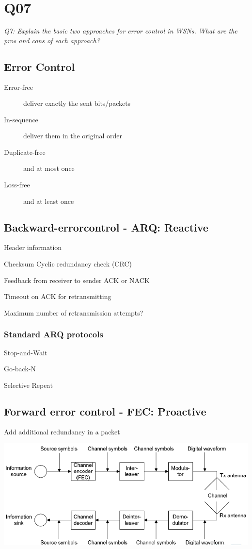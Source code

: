 \chapter{Q07}
\emph{Q7: Explain the basic two approaches for error control in WSNs. What are
the pros and cons of each approach?}

\section{Error Control}

\begin{description}
	\item[Error-free] deliver exactly the sent bits/packets
	\item[In-sequence] deliver them in the original order
	\item[Duplicate-free] and at most once
	\item[Loss-free] and at least once
\end{description}


\section{Backward-errorcontrol - ARQ: Reactive}

Header information

Checksum Cyclic redundancy check (CRC) 

Feedback from receiver to sender ACK or NACK

Timeout on ACK for retransmitting

Maximum number of retransmission attempts?

\subsection{Standard ARQ protocols}
\begin{description}
	\item Stop-and-Wait
	\item Go-back-N
	\item Selective Repeat
\end{description}

\section{Forward error control - FEC: Proactive}

Add additional redundancy in a packet

\begin{center}
 \includegraphics[scale=0.5]{img/ErrorControle-FEC.png}
\end{center}

